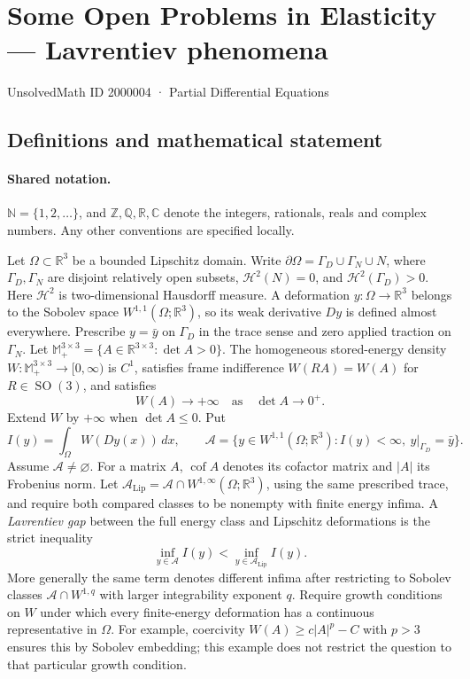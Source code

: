 \documentclass[11pt]{book}
\begin{document}
\setcounter{section}{2000003}
\section{Some Open Problems in Elasticity — Lavrentiev phenomena}\label{2000004}
{\small\sffamily UnsolvedMath ID 2000004 · Partial Differential Equations}
\subsection{Definitions and mathematical statement}

\paragraph{Shared notation.}$\mathbb N=\{1,2,\ldots\}$, and $\mathbb Z,\mathbb Q,\mathbb R,\mathbb C$ denote the integers, rationals, reals and complex numbers. Any other conventions are specified locally.


Let $\Omega\subset\mathbb R^3$ be a bounded Lipschitz domain. Write $\partial\Omega=\Gamma_D\cup\Gamma_N\cup N$, where $\Gamma_D,\Gamma_N$ are disjoint relatively open subsets, $\mathcal H^2(N)=0$, and $\mathcal H^2(\Gamma_D)>0$. Here $\mathcal H^2$ is two-dimensional Hausdorff measure. A deformation $y:\Omega\to\mathbb R^3$ belongs to the Sobolev space $W^{1,1}(\Omega;\mathbb R^3)$, so its weak derivative $Dy$ is defined almost everywhere. Prescribe $y=\bar y$ on $\Gamma_D$ in the trace sense and zero applied traction on $\Gamma_N$.
Let $\mathbb M_+^{3\times3}=\{A\in\mathbb R^{3\times3}:\det A>0\}$. The homogeneous stored-energy density $W:\mathbb M_+^{3\times3}\to[0,\infty)$ is $C^1$, satisfies frame indifference $W(RA)=W(A)$ for $R\in\operatorname{SO}(3)$, and satisfies
\[
 W(A)\longrightarrow+\infty\quad\text{as}\quad\det A\longrightarrow0^+.
\]
Extend $W$ by $+\infty$ when $\det A\le0$. Put
\[
 I(y)=\int_\Omega W(Dy(x))\,dx,\qquad
 \mathcal A=\{y\in W^{1,1}(\Omega;\mathbb R^3):I(y)<\infty,\ y|_{\Gamma_D}=\bar y\}.
\]
Assume $\mathcal A\ne\varnothing$. For a matrix $A$, $\operatorname{cof}A$ denotes its cofactor matrix and $|A|$ its Frobenius norm.
Let $\mathcal A_{\mathrm{Lip}}=\mathcal A\cap W^{1,\infty}(\Omega;\mathbb R^3)$, using the same prescribed trace, and require both compared classes to be nonempty with finite energy infima. A \emph{Lavrentiev gap} between the full energy class and Lipschitz deformations is the strict inequality
\[
 \inf_{y\in\mathcal A} I(y)<\inf_{y\in\mathcal A_{\mathrm{Lip}}} I(y).
\]
More generally the same term denotes different infima after restricting to Sobolev classes $\mathcal A\cap W^{1,q}$ with larger integrability exponent $q$. Require growth conditions on $W$ under which every finite-energy deformation has a continuous representative in $\Omega$. For example, coercivity $W(A)\ge c|A|^p-C$ with $p>3$ ensures this by Sobolev embedding; this example does not restrict the question to that particular growth condition.
\end{document}
